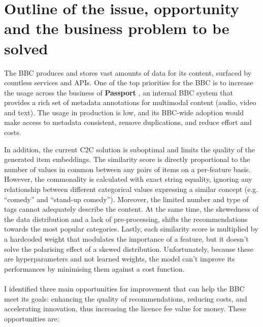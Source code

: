 
\section{Outline of the issue, opportunity and the business problem to be solved}

The BBC produces and stores vast amounts of data for its content, surfaced by countless services and APIs.
One of the top priorities for the BBC is to increase the usage across the business of \textbf{Passport} \cite{BBC:PassportMetadata},
an internal BBC system that provides a rich set of metadata annotations for multimodal content (audio, video and text).
The usage in production is low, and its BBC-wide adoption would make access to metadata consistent, remove duplications, and reduce effort and costs.

In addition, the current C2C solution is suboptimal and limits the quality of the generated item embeddings.
The similarity score is directly proportional to the number of values in common between any pairs of items
on a per-feature basis. However, the commonality is calculated with exact string equality, ignoring any relationship between different
categorical values expressing a similar concept (e.g. ``comedy'' and ``stand-up comedy'').
Moreover, the limited number and type of tags cannot adequately describe the content.
At the same time, the skewedness of the data distribution and a lack of pre-processing, shifts the recommendations towards the most popular categories.
Lastly, each similarity score is multiplied by a hardcoded weight that modulates the importance of a feature, but it doesn't solve
the polarising effect of a skewed distribution. Unfortunately, because these are hyperparameters and not learned weights, the model can't improve
its performances by minimising them against a cost function.
\\ \\
I identified three main opportunities for improvement that can help the BBC meet its goals:
enhancing the quality of recommendations, reducing costs, and accelerating innovation,
thus increasing the licence fee value for money. These opportunities are:

